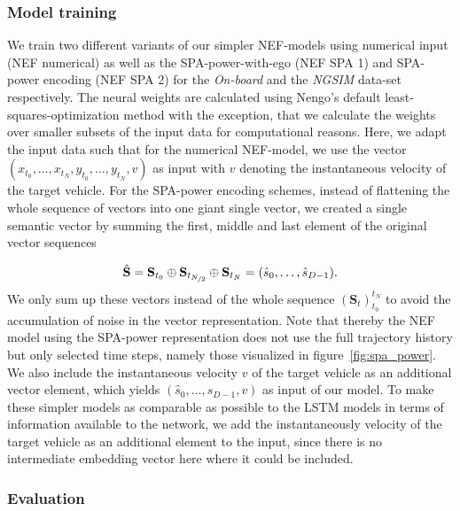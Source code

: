 \subsubsection{Model training}%
\label{ssubsec:model_training_nef}

We train two different variants of our simpler \ac{NEF}-models using numerical input (\acs{NEF} numerical) as well as the \ac{SPA}-power-with-ego (\acs{NEF} \acs{SPA} \num{1}) and \ac{SPA}-power encoding (\acs{NEF} \acs{SPA} \num{2}) for the \emph{On-board} and the \emph{\ac{NGSIM}} data-set respectively.
The neural weights are calculated using \acs{Nengo}'s default least-squares-optimization method with the exception, that we calculate the weights over smaller subsets of the input data for computational reasons.
Here, we adapt the input data such that for the numerical \ac{NEF}-model, we use the vector $(x_{t_{0}}, \ldots, x_{t_{N}}, y_{t_{0}}, \ldots, y_{t_{N}}, v)$ as input with $v$ denoting the instantaneous velocity of the target vehicle.
For the \ac{SPA}-power encoding schemes, instead of flattening the whole sequence of vectors into one giant single vector, we created a single semantic vector by summing the first, middle and last element of the original vector sequences

\begin{equation}
  \hat{\mathbf{S}} =  \mathbf{S}_{t_0} \oplus \mathbf{S}_{t_{\nicefrac{N}{2}}} \oplus \mathbf{S}_{t_N} = (\hat{s}_0, \ldots, \hat{s}_{D-1}).
\end{equation}
We only sum up these vectors instead of the whole sequence $(\mathbf{S}_{t})_{t_0}^{t_N}$ to avoid the accumulation of noise in the vector representation.
Note that thereby the \ac{NEF} model using the \ac{SPA}-power representation does not use the full trajectory history but only selected time steps, namely those visualized in figure~\ref{fig:spa_power}.
We also include the instantaneous velocity $v$ of the target vehicle as an additional vector element, which yields $(\hat{s}_0, \ldots, \hat{s}_{D-1}, v)$ as input of our model.
To make these simpler models as comparable as possible to the \ac{LSTM} models in terms of information available to the network, we add the instantaneously velocity of the target vehicle as an additional element to the input, since there is no intermediate embedding vector here where it could be included.

\subsubsection{Evaluation}%
\label{ssubsec:evaluation_nef}


